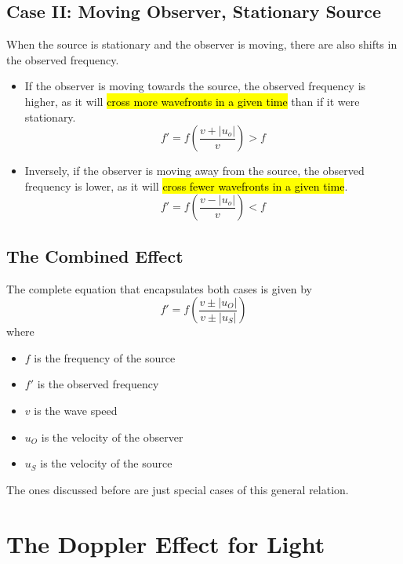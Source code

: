 \documentclass[a4paper,12pt]{article}
\let\oldsection\section
\renewcommand\section{\clearpage\oldsection}
\newcommand{\paren}[1]{\left(#1\right)}
\begin{document}
\pagebreak


\subsection{Case II: Moving Observer, Stationary Source}

When the source is stationary and the observer is moving, there are also shifts in the observed frequency.
\begin{itemize}
  \item If the observer is moving towards the source, the observed frequency is higher, as it will \hl{cross more wavefronts in a given time} than if it were stationary.
        \begin{equation}
          f' = f\paren{\frac{v + |u_o|}{v}} > f
        \end{equation}
  \item Inversely, if the observer is moving away from the source, the observed frequency is lower, as it will \hl{cross fewer wavefronts in a given time}.
        \begin{equation}
          f' = f\paren{\frac{v - |u_o|}{v}} < f
        \end{equation}
\end{itemize}

\subsection{The Combined Effect}

The complete equation that encapsulates both cases is given by
\begin{equation}
  f' = f\paren{\frac{v\pm |u_O|}{v\pm |u_S|}}
\end{equation}
where
\begin{itemize}
  \item $f$ is the frequency of the source
  \item $f'$ is the observed frequency
  \item $v$ is the wave speed
  \item $u_O$ is the velocity of the observer
  \item $u_S$ is the velocity of the source
\end{itemize}

The ones discussed before are just special cases of this general relation.

\section{The Doppler Effect for Light}
\end{document}

